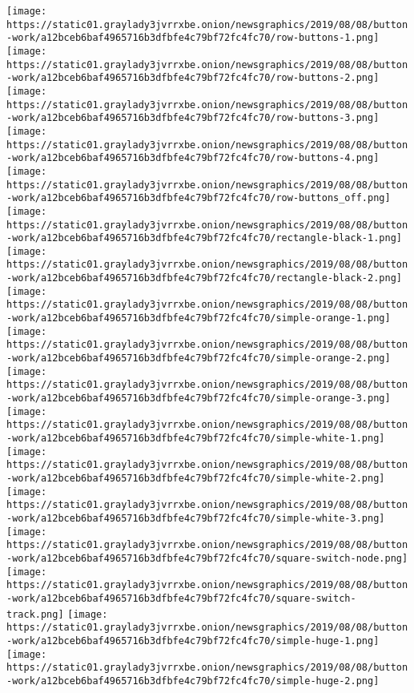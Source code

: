 \texttt{[image: https://static01.graylady3jvrrxbe.onion/newsgraphics/2019/08/08/button-work/a12bceb6baf4965716b3dfbfe4c79bf72fc4fc70/row-buttons-1.png]}
\texttt{[image: https://static01.graylady3jvrrxbe.onion/newsgraphics/2019/08/08/button-work/a12bceb6baf4965716b3dfbfe4c79bf72fc4fc70/row-buttons-2.png]}
\texttt{[image: https://static01.graylady3jvrrxbe.onion/newsgraphics/2019/08/08/button-work/a12bceb6baf4965716b3dfbfe4c79bf72fc4fc70/row-buttons-3.png]}
\texttt{[image: https://static01.graylady3jvrrxbe.onion/newsgraphics/2019/08/08/button-work/a12bceb6baf4965716b3dfbfe4c79bf72fc4fc70/row-buttons-4.png]}
\texttt{[image: https://static01.graylady3jvrrxbe.onion/newsgraphics/2019/08/08/button-work/a12bceb6baf4965716b3dfbfe4c79bf72fc4fc70/row-buttons\_off.png]}
\texttt{[image: https://static01.graylady3jvrrxbe.onion/newsgraphics/2019/08/08/button-work/a12bceb6baf4965716b3dfbfe4c79bf72fc4fc70/rectangle-black-1.png]}
\texttt{[image: https://static01.graylady3jvrrxbe.onion/newsgraphics/2019/08/08/button-work/a12bceb6baf4965716b3dfbfe4c79bf72fc4fc70/rectangle-black-2.png]}
\texttt{[image: https://static01.graylady3jvrrxbe.onion/newsgraphics/2019/08/08/button-work/a12bceb6baf4965716b3dfbfe4c79bf72fc4fc70/simple-orange-1.png]}
\texttt{[image: https://static01.graylady3jvrrxbe.onion/newsgraphics/2019/08/08/button-work/a12bceb6baf4965716b3dfbfe4c79bf72fc4fc70/simple-orange-2.png]}
\texttt{[image: https://static01.graylady3jvrrxbe.onion/newsgraphics/2019/08/08/button-work/a12bceb6baf4965716b3dfbfe4c79bf72fc4fc70/simple-orange-3.png]}
\texttt{[image: https://static01.graylady3jvrrxbe.onion/newsgraphics/2019/08/08/button-work/a12bceb6baf4965716b3dfbfe4c79bf72fc4fc70/simple-white-1.png]}
\texttt{[image: https://static01.graylady3jvrrxbe.onion/newsgraphics/2019/08/08/button-work/a12bceb6baf4965716b3dfbfe4c79bf72fc4fc70/simple-white-2.png]}
\texttt{[image: https://static01.graylady3jvrrxbe.onion/newsgraphics/2019/08/08/button-work/a12bceb6baf4965716b3dfbfe4c79bf72fc4fc70/simple-white-3.png]}
\texttt{[image: https://static01.graylady3jvrrxbe.onion/newsgraphics/2019/08/08/button-work/a12bceb6baf4965716b3dfbfe4c79bf72fc4fc70/square-switch-node.png]}
\texttt{[image: https://static01.graylady3jvrrxbe.onion/newsgraphics/2019/08/08/button-work/a12bceb6baf4965716b3dfbfe4c79bf72fc4fc70/square-switch-track.png]}
\texttt{[image: https://static01.graylady3jvrrxbe.onion/newsgraphics/2019/08/08/button-work/a12bceb6baf4965716b3dfbfe4c79bf72fc4fc70/simple-huge-1.png]}
\texttt{[image: https://static01.graylady3jvrrxbe.onion/newsgraphics/2019/08/08/button-work/a12bceb6baf4965716b3dfbfe4c79bf72fc4fc70/simple-huge-2.png]}
